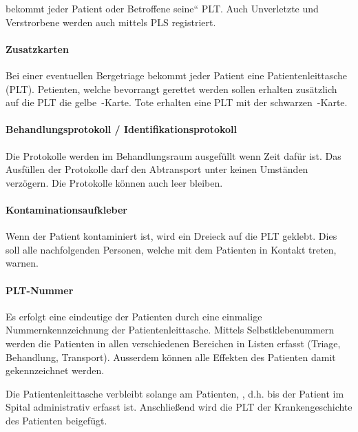  bekommt jeder Patient oder
Betroffene {\quotedblbase}seine{\textquotedblleft} PLT. Auch Unverletzte und
Verstrorbene werden auch mittels PLS registriert.

\paragraph{Zusatzkarten}

Bei einer eventuellen Bergetriage bekommt jeder Patient eine
Patientenleittasche (PLT). Petienten, welche bevorrangt gerettet werden
sollen erhalten zus\"atzlich auf die PLT die gelbe
{}\,-Karte. Tote erhalten
eine PLT mit der schwarzen {}\,-Karte.

\paragraph{Behandlungsprotokoll / Identifikationsprotokoll}

Die Protokolle werden im Behandlungsraum ausgef\"ullt wenn Zeit daf\"ur
ist. Das Ausf\"ullen der Protokolle darf den Abtransport unter keinen
Umst\"anden verz\"ogern. Die Protokolle k\"onnen auch leer bleiben.

\paragraph{Kontaminationsaufkleber}

Wenn der Patient kontaminiert ist, wird ein Dreieck auf die PLT geklebt.
Dies soll alle nachfolgenden Personen, welche mit dem Patienten in
Kontakt treten, warnen.

\paragraph{PLT-Nummer}

Es erfolgt eine eindeutige  der Patienten durch eine
einmalige Nummernkennzeichnung der Patientenleittasche. Mittels
Selbstklebenummern werden die Patienten in allen verschiedenen
Bereichen in Listen erfasst (Triage, Behandlung, Transport). Ausserdem
k\"onnen alle Effekten des Patienten damit gekennzeichnet werden.

Die Patientenleittasche verbleibt solange am Patienten, , d.h. bis der Patient im
Spital administrativ erfasst ist. Anschlie{\ss}end wird die PLT der
Krankengeschichte des Patienten beigef\"ugt.

